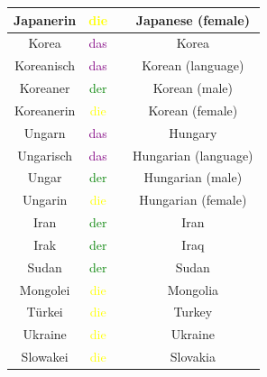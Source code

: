 \begin{center}
\begin{longtable} {|c|c|c|c|}
        Japanerin      & \textcolor{yellow}{die}   &                     & Japanese (female)    \\
        \hline
        Korea          & \textcolor{purple}{das}   &                     & Korea                \\
        Koreanisch     & \textcolor{purple}{das}   &                     & Korean (language)    \\
        Koreaner       & \textcolor{green}{der}    &                     & Korean (male)        \\
        Koreanerin     & \textcolor{yellow}{die}   &                     & Korean (female)      \\
        \hline
        Ungarn         & \textcolor{purple}{das}   &                     & Hungary              \\
        Ungarisch      & \textcolor{purple}{das}   &                     & Hungarian (language) \\
        Ungar          & \textcolor{green}{der}    &                     & Hungarian (male)     \\
        Ungarin        & \textcolor{yellow}{die}   &                     & Hungarian (female)   \\
        \hline
        Iran           & \textcolor{green}{der}    &                     & Iran                 \\
        Irak           & \textcolor{green}{der}    &                     & Iraq                 \\
        Sudan          & \textcolor{green}{der}    &                     & Sudan                \\
        \hline
        Mongolei       & \textcolor{yellow}{die}   &                     & Mongolia             \\
        Türkei         & \textcolor{yellow}{die}   &                     & Turkey               \\
        Ukraine        & \textcolor{yellow}{die}   &                     & Ukraine              \\
        Slowakei       & \textcolor{yellow}{die}   &                     & Slovakia             \\
        \hline
    \end{longtable}
\end{center}

